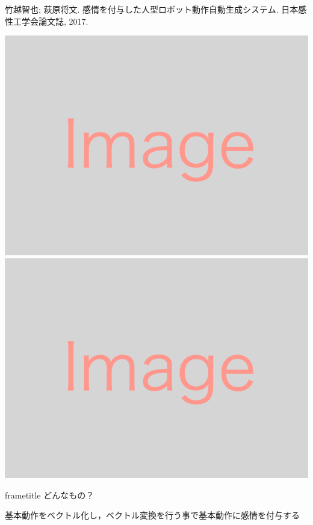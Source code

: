\begin{frame}[plain,t]
  {竹越智也; 萩原将文. 感情を付与した人型ロボット動作自動生成システム. 日本感性工学会論文誌, 2017.}
  \begin{minipage}[t]{\linewidth}
      \includegraphics[height=0.15\textheight,keepaspectratio]{img/img.png}
      \includegraphics[height=0.15\textheight,keepaspectratio]{img/img.png}
  \end{minipage}

  \begin{multicols}{2}
    \begin{beamercolorbox}[rounded=true, center, shadow=true,wd=\linewidth]{frametitle}
      どんなもの？
    \end{beamercolorbox}
    基本動作をベクトル化し，ベクトル変換を行う事で基本動作に感情を付与する
    

\end{multicols}
\end{frame}
